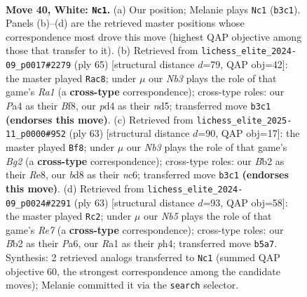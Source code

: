 \documentclass[11pt]{article}
\begin{document}
\clearpage

\begin{figure}[p]\centering
\begin{subfigure}{0.46\textwidth}\centering
\resizebox{\linewidth}{!}{%
\newchessgame
\chessboard[
  setfen={rn1b2r1/1p3b1p/2k3pP/pN2Pp2/P2p4/1N1R2P1/1B5K/R7 w - - 4 40},
  showmover=false,
  pgfstyle=straightmove, color=movearrow, markmove={b3-c1}
]}
\caption{}
\end{subfigure}\hfill
\begin{subfigure}{0.46\textwidth}\centering
\resizebox{\linewidth}{!}{%
\newchessgame
\chessboard[
  setfen={r2r1b2/5ppk/7p/3Np3/p3n1P1/P2R1b1P/1PR2P2/2B2BK1 b - - 18 33},
  showmover=false,
  pgfstyle=straightmove, color=movearrow, markmove={a8-c8}
]}
\caption{}
\end{subfigure}
\\[4pt]
\begin{subfigure}{0.46\textwidth}\centering
\resizebox{\linewidth}{!}{%
\newchessgame
\chessboard[
  setfen={4r1k1/2n2pb1/2NR2p1/1P5p/r1PB1P2/p5P1/P6P/2R3K1 b - - 4 32},
  showmover=false,
  pgfstyle=straightmove, color=movearrow, markmove={g7-f8}
]}
\caption{}
\end{subfigure}\hfill
\begin{subfigure}{0.46\textwidth}\centering
\resizebox{\linewidth}{!}{%
\newchessgame
\chessboard[
  setfen={3r4/5p2/p1k1pP2/8/1Pp4P/2Bn1RP1/1P2r3/3R1K2 b - - 6 32},
  showmover=false,
  pgfstyle=straightmove, color=movearrow, markmove={e2-c2}
]}
\caption{}
\end{subfigure}
\caption{\textbf{Move 40, White: \texttt{Nc1}.} (a) Our position; Melanie plays \texttt{Nc1} (\texttt{b3c1}). Panels (b)--(d) are the retrieved master positions whose correspondence most drove this move (highest QAP objective among those that transfer to it). (b) Retrieved from \texttt{lichess\_elite\_2024-09\_p0017\#2279} (ply 65) [structural distance $d$=79, QAP obj=42]: the master played \texttt{Rac8}; under $\mu$ our \emph{Nb3} plays the role of that game's \emph{Ra1} (a \textbf{cross-type} correspondence); cross-type roles: our \emph{P}a4 as their \emph{B}f8, our \emph{p}d4 as their \emph{n}d5; transferred move \texttt{b3c1} \textbf{(endorses this move)}. (c) Retrieved from \texttt{lichess\_elite\_2025-11\_p0000\#952} (ply 63) [structural distance $d$=90, QAP obj=17]: the master played \texttt{Bf8}; under $\mu$ our \emph{Nb3} plays the role of that game's \emph{Bg2} (a \textbf{cross-type} correspondence); cross-type roles: our \emph{B}b2 as their \emph{R}e8, our \emph{b}d8 as their \emph{n}c6; transferred move \texttt{b3c1} \textbf{(endorses this move)}. (d) Retrieved from \texttt{lichess\_elite\_2024-09\_p0024\#2291} (ply 63) [structural distance $d$=93, QAP obj=58]: the master played \texttt{Rc2}; under $\mu$ our \emph{Nb5} plays the role of that game's \emph{Re7} (a \textbf{cross-type} correspondence); cross-type roles: our \emph{B}b2 as their \emph{P}a6, our \emph{R}a1 as their \emph{p}h4; transferred move \texttt{b5a7}. Synthesis: 2 retrieved analogs transferred to \texttt{Nc1} (summed QAP objective 60, the strongest correspondence among the candidate moves); Melanie committed it via the \texttt{search} selector.}
\label{fig:thought-m78}
\end{figure}
\end{document}

